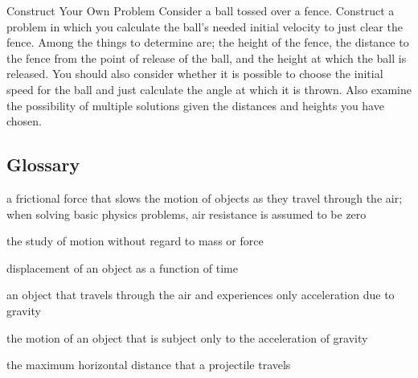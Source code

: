 \documentclass[
]{book}
\providecommand{\tightlist}{%
  \setlength{\itemsep}{0pt}\setlength{\parskip}{0pt}}
\begin{document}
\hypertarget{fs-id1815382}{}
\hypertarget{fs-id2255165}{}
{Construct Your Own Problem} Consider a ball tossed
over a fence. Construct a problem in which you calculate the ball's
needed initial velocity to just clear the fence. Among the things to
determine are; the height of the fence, the distance to the fence from
the point of release of the ball, and the height at which the ball is
released. You should also consider whether it is possible to choose the
initial speed for the ball and just calculate the angle at which it is
thrown. Also examine the possibility of multiple solutions given the
distances and heights you have chosen.

\hypertarget{glossary-9}{%
\subsection{Glossary}\label{glossary-9}}

\begin{description}
\tightlist
\item[air resistance]
a frictional force that slows the motion of objects as they travel
through the air; when solving basic physics problems, air resistance
is assumed to be zero
\end{description}

\begin{description}
\tightlist
\item[kinematics]
the study of motion without regard to mass or force
\end{description}

\begin{description}
\tightlist
\item[motion]
displacement of an object as a function of time
\end{description}

\begin{description}
\tightlist
\item[projectile]
an object that travels through the air and experiences only
acceleration due to gravity
\end{description}

\begin{description}
\tightlist
\item[projectile motion]
the motion of an object that is subject only to the acceleration of
gravity
\end{description}

\begin{description}
\tightlist
\item[range]
the maximum horizontal distance that a projectile travels
\end{description}
\end{document}
